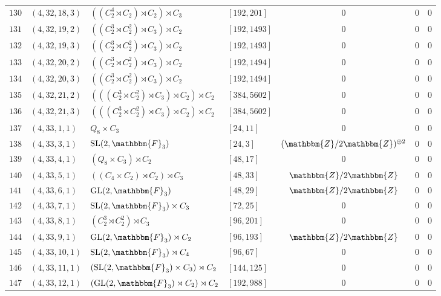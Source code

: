 \documentclass{amsart}
\theoremstyle{plain}
\theoremstyle{definition}
\theoremstyle{remark}
\newcommand{\bZ}{\mathbbm{Z}}\newcommand{\bQ}{\mathbbm{Q}}
\newcommand{\bF}{\mathbbm{F}}\newcommand{\bP}{\mathbbm{P}}
\newcommand{\GL}{{\rm GL}}\newcommand{\SL}{{\rm SL}}
\begin{document}
{\begin{longtable}{llll|ccc}
$130$ & $( 4, 32, 18, 3 )$ & $((C_2^4 \rtimes C_2) \rtimes C_2) \rtimes C_3$ & $[ 192, 201 ]$& $0$ & $0$ & $0$\\
$131$ & $( 4, 32, 19, 2 )$ & $((C_2^3 \rtimes C_2^2) \rtimes C_3) \rtimes C_2$ & $[ 192, 1493 ]$& $0$ & $0$ & $0$\\
$132$ & $( 4, 32, 19, 3 )$ & $((C_2^3 \rtimes C_2^2) \rtimes C_3) \rtimes C_2$ & $[ 192, 1493 ]$& $0$ & $0$ & $0$\\
$133$ & $( 4, 32, 20, 2 )$ & $((C_2^3 \rtimes C_2^2) \rtimes C_3) \rtimes C_2$ & $[ 192, 1494 ]$& $0$ & $0$ & $0$\\
$134$ & $( 4, 32, 20, 3 )$ & $((C_2^3 \rtimes C_2^2) \rtimes C_3) \rtimes C_2$ & $[ 192, 1494 ]$& $0$ & $0$ & $0$\\
$135$ & $( 4, 32, 21, 2 )$ & $(((C_2^3 \rtimes C_2^2) \rtimes C_3) \rtimes C_2) \rtimes C_2$ & $[ 384, 5602 ]$& $0$ & $0$ & $0$\\
$136$ & $( 4, 32, 21, 3 )$ & $(((C_2^3 \rtimes C_2^2) \rtimes C_3) \rtimes C_2) \rtimes C_2$ & $[ 384, 5602 ]$& $0$ & $0$ & $0$\\
$137$ & $( 4, 33, 1, 1 )$ & $Q_8 \times C_3$ & $[ 24, 11 ]$& $0$ & $0$ & $0$\\
$138$ & $( 4, 33, 3, 1 )$ & $\SL(2,\bF_3)$ & $[ 24, 3 ]$& $(\bZ/2\bZ)^{\oplus 2}$ & $0$ & $0$\\
$139$ & $( 4, 33, 4, 1 )$ & $(Q_8 \times C_3) \rtimes C_2$ & $[ 48, 17 ]$& $0$ & $0$ & $0$\\
$140$ & $( 4, 33, 5, 1 )$ & $((C_4 \times C_2) \rtimes C_2) \rtimes C_3$ & $[ 48, 33 ]$& $\bZ/2\bZ$ & $0$ & $0$\\
$141$ & $( 4, 33, 6, 1 )$ & $\GL(2,\bF_3)$ & $[ 48, 29 ]$& $\bZ/2\bZ$ & $0$ & $0$\\
$142$ & $( 4, 33, 7, 1 )$ & $\SL(2,\bF_3) \times C_3$ & $[ 72, 25 ]$& $0$ & $0$ & $0$\\
$143$ & $( 4, 33, 8, 1 )$ & $(C_2^3 \rtimes C_2^2) \rtimes C_3$ & $[ 96, 201 ]$& $0$ & $0$ & $0$\\
$144$ & $( 4, 33, 9, 1 )$ & $\GL(2,\bF_3) \rtimes C_2$ & $[ 96, 193 ]$& $\bZ/2\bZ$ & $0$ & $0$\\
$145$ & $( 4, 33, 10, 1 )$ & $\SL(2,\bF_3) \rtimes C_4$ & $[ 96, 67 ]$& $0$ & $0$ & $0$\\
$146$ & $( 4, 33, 11, 1 )$ & $(\SL(2,\bF_3) \times C_3) \rtimes C_2$ & $[ 144, 125 ]$& $0$ & $0$ & $0$\\
$147$ & $( 4, 33, 12, 1 )$ & $(\GL(2,\bF_3) \rtimes C_2) \rtimes C_2$ & $[192, 988 ]$& $0$ & $0$ & $0$\\

\end{longtable}}
\end{document}
